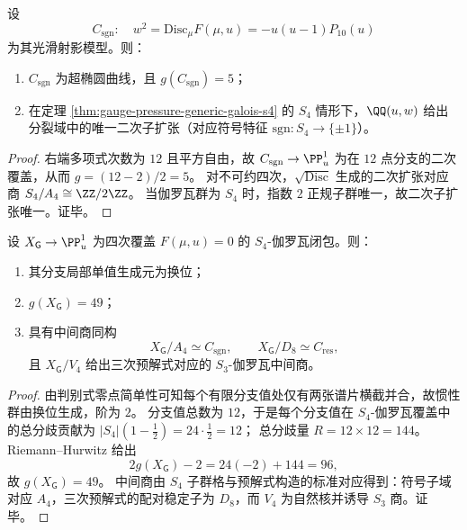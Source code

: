 \begin{theorem}[判别式二次子覆叠与唯一二次子扩张]\label{thm:gauge-pressure-sign-cover-genus5}
设
\[
C_{\mathrm{sgn}}:\quad w^2=\mathrm{Disc}_{\mu}F(\mu,u)=-u(u-1)P_{10}(u)
\]
为其光滑射影模型。则：
\begin{enumerate}
  \item \(C_{\mathrm{sgn}}\) 为超椭圆曲线，且 \(g(C_{\mathrm{sgn}})=5\)；
  \item 在定理 \ref{thm:gauge-pressure-generic-galois-s4} 的 \(S_4\) 情形下，\(\QQ(u,w)\) 给出分裂域中的唯一二次子扩张（对应符号特征 \(\mathrm{sgn}:S_4\to\{\pm1\}\)）。
\end{enumerate}
\end{theorem}
\begin{proof}
右端多项式次数为 \(12\) 且平方自由，故 \(C_{\mathrm{sgn}}\to\PP^1_u\) 为在 \(12\) 点分支的二次覆盖，从而
\(
g=(12-2)/2=5
\)。
对不可约四次，\(\sqrt{\mathrm{Disc}}\) 生成的二次扩张对应商 \(S_4/A_4\cong \ZZ/2\ZZ\)。
当伽罗瓦群为 \(S_4\) 时，指数 \(2\) 正规子群唯一，故二次子扩张唯一。证毕。
\end{proof}

\begin{theorem}\label{thm:gauge-pressure-s4-closure-genus49}
设 \(X_{\mathsf G}\to\PP^1_u\) 为四次覆盖 \(F(\mu,u)=0\) 的 \(S_4\)-伽罗瓦闭包。则：
\begin{enumerate}
  \item 其分支局部单值生成元为换位；
  \item \(g(X_{\mathsf G})=49\)；
  \item 具有中间商同构
  \[
  X_{\mathsf G}/A_4\simeq C_{\mathrm{sgn}},\qquad
  X_{\mathsf G}/D_8\simeq C_{\mathrm{res}},
  \]
  且 \(X_{\mathsf G}/V_4\) 给出三次预解式对应的 \(S_3\)-伽罗瓦中间商。
\end{enumerate}
\end{theorem}
\begin{proof}
由判别式零点简单性可知每个有限分支值处仅有两张谱片横截并合，故惯性群由换位生成，阶为 \(2\)。
分支值总数为 \(12\)，于是每个分支值在 \(S_4\)-伽罗瓦覆盖中的总分歧贡献为
\(
|S_4|(1-\frac12)=24\cdot\frac12=12
\)；
总分歧量 \(R=12\times 12=144\)。
Riemann--Hurwitz 给出
\[
2g(X_{\mathsf G})-2=24(-2)+144=96,
\]
故 \(g(X_{\mathsf G})=49\)。
中间商由 \(S_4\) 子群格与预解式构造的标准对应得到：符号子域对应 \(A_4\)，三次预解式的配对稳定子为 \(D_8\)，而 \(V_4\) 为自然核并诱导 \(S_3\) 商。证毕。
\end{proof}

